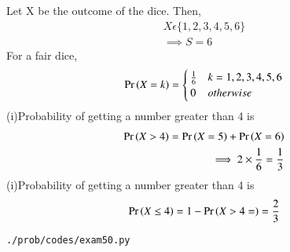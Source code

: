 Let X be the outcome of the dice. Then,
\begin{align}
X \epsilon \{1,2,3,4,5,6\}
\\
\implies S=6
\end{align}
For a fair dice,
\begin{align}
\Pr\left(X=k\right)=\begin{cases}
        \frac{1}{6}& k=1,2,3,4,5,6\\
        0 & otherwise
        \end{cases}
\end{align}
(i)Probability of getting a number greater than 4 is
\begin{align}
\Pr\left(X > 4\right)=\Pr\left(X=5\right)+\Pr\left(X=6\right)
 \\
\implies 2 \times \frac{1}{6}=\frac{1}{3}
\end{align}
(i)Probability of getting a number greater than 4 is
\begin{align}
\Pr\left(X \leq 4\right)=1-\Pr\left(X>4=\right)=\frac{2}{3}
\end{align}
\begin{lstlisting}
./prob/codes/exam50.py
\end{lstlisting}
